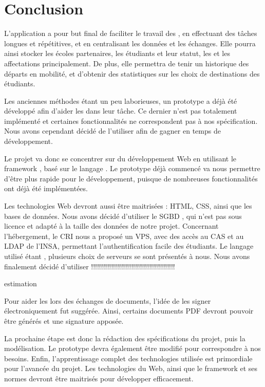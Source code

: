 
	\chapter*{Conclusion}

L'application a pour but final de faciliter le travail des \ris, en effectuant des tâches longues et répétitives, et en centralisant les données et les échanges. Elle pourra ainsi stocker les écoles partenaires, les étudiants et leur statut, les \voe et les affectations principalement. De plus, elle permettra de tenir un historique des départs en mobilité, et d'obtenir des statistiques sur les choix de destinations des étudiants. 

\medbreak

Les anciennes méthodes étant un peu laborieuses, un prototype a déjà été développé afin d'aider les \ris dans leur tâche. Ce dernier n'est pas totalement implémenté et certaines fonctionnalités ne correspondent pas à nos spécification. Nous avons cependant décidé de l'utiliser afin de gagner en temps de développement.

Le projet va donc se concentrer sur du développement Web en utilisant le framework \symfony, basé sur le langage \php.
Le prototype déjà commencé va nous permettre d'être plus rapide pour le développement, puisque de nombreuses fonctionnalités ont déjà été implémentées. 

Les technologies Web devront aussi être maitrisées : HTML, CSS, ainsi que les bases de données. Nous avons décidé d'utiliser le SGBD \mdb, qui n'est pas sous licence et adapté à la taille des données de notre projet. Concernant l'hébergement, le CRI nous a proposé un VPS, avec des accès au CAS et au LDAP de l'INSA, permettant l'authentification facile des étudiants. Le langage utilisé étant \php, plusieurs choix de serveurs se sont présentés à nous. Nous avons finalement décidé d'utiliser !!!!!!!!!!!!!!!!!!!!!!!!!!!!!!!!!!!!!!!!!!

estimation


Pour aider les \ris lors des échanges de documents, l'idée de les signer électroniquement fut suggérée. Ainsi, certains documents PDF devront pouvoir être générés et une signature apposée. 

\medbreak

La prochaine étape est donc la rédaction des spécifications du projet, puis la modélisation. Le prototype devra également être modifié pour correspondre à nos besoins. Enfin, l'apprentissage complet des technologies utilisée est primordiale pour l'avancée du projet. Les technologies du Web, ainsi que le framework \symfony et ses normes devront être maitrisés pour développer efficacement.